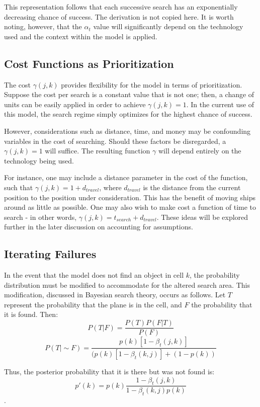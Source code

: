 \documentclass[a4paper]{article}
\begin{document}
This representation follows that each successive search has an exponentially decreasing chance of success. The derivation is not copied here. It is worth noting, however, that the $\alpha_t$ value will significantly depend on the technology used and the context within the model is applied.

\subsection{Cost Functions as Prioritization}

The cost $\gamma(j,k)$ provides flexibility for the model in terms of prioritization. Suppose the cost per search is a constant value that is not one; then, a change of units can be easily applied in order to achieve $\gamma(j,k)=1$. In the current use of this model, the search regime simply optimizes for the highest chance of success. 

However, considerations such as distance, time, and money may be confounding variables in the cost of searching. Should these factors be disregarded, a $\gamma(j,k)=1$ will suffice. The resulting function $\gamma$ will depend entirely on the technology being used. 

For instance, one may include a distance parameter in the cost of the function, such that $\gamma(j,k)=1+d_{travel}$, where $d_{travel}$ is the distance from the current position to the position under consideration. This has the benefit of moving ships around as little as possible. One may also wish to make cost a function of time to search - in other words, $\gamma(j,k)=t_{search}+d_{travel}$. These ideas will be explored further in the later discussion on accounting for assumptions. 

\subsection{Iterating Failures}

In the event that the model does not find an object in cell $k$, the probability distribution must be modified to accommodate for the altered search area. This modification, discussed in Bayesian search theory, occurs as follows. Let $T$ represent the probability that the plane is in the cell, and $F$ the probability that it is found. Then: 
$$P(T|F)=\frac{P(T)P(F|T)}{P(F)}$$ 
$$P(T|\sim F)=\frac{p(k)[1-\beta_t(j,k)]}{(p(k)[1-\beta_t(k,j)]+(1-p(k))}$$

Thus, the posterior probability that it is there but was not found is: $$p'(k)=p(k)\frac{1-\beta_t(j,k)}{1-\beta_t(k,j)p(k)}$$.
\end{document}

